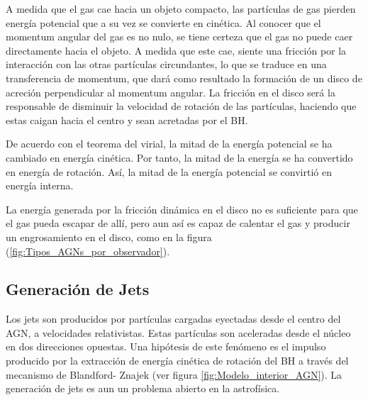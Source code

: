A medida que el gas cae hacia un objeto compacto, las partículas de gas pierden energía potencial que a su vez se convierte en cinética. Al conocer que el momentum angular del gas es no nulo, se tiene certeza que el gas no puede caer directamente hacia el objeto. A medida que este cae, siente una fricción por la interacción con las otras partículas circundantes, lo que se traduce en una transferencia de momentum, que dará como resultado la formación de un disco de acreción perpendicular al momentum angular. La fricción en el disco será la responsable de disminuir la velocidad de rotación de las partículas, haciendo que estas caigan hacia el centro y sean acretadas por el BH.  

De acuerdo con el teorema del virial, la mitad de la energía potencial se ha cambiado en energía cinética. Por tanto, la mitad de la energía se ha convertido en energía de rotación. Así, la mitad de la energía potencial se convirtió en energía interna. 

La energía generada por la fricción dinámica en el disco no es suficiente para que el gas pueda escapar de allí, pero aun así es capaz de calentar el gas y producir un engrosamiento en el disco, como en la figura (\ref{fig:Tipos_AGNs_por_observador}).


	\subsection{Generación de Jets}
	\label{subsec:Generation_Jets}

Los jets son producidos por partículas cargadas eyectadas desde el centro del AGN, a velocidades relativistas. Estas partículas son aceleradas desde el núcleo en dos direcciones opuestas. Una hipótesis de este fenómeno es el impulso producido por la extracción de energía cinética de rotación del BH a través del mecanismo de Blandford- Znajek \cite{blandford1977} (ver figura  \ref{fig:Modelo_interior_AGN}). La generación de jets es aun un problema abierto en la astrofísica.%

